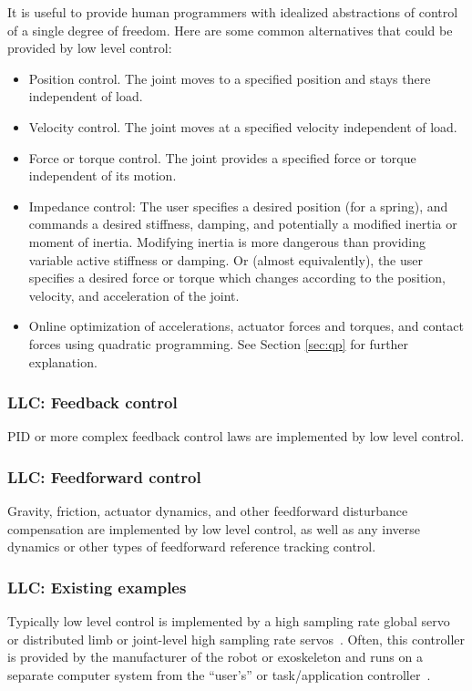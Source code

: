 \documentclass[letterpaper,12pt,fullpage]{article}
\begin{document}
It is useful to provide human programmers
with idealized abstractions of control of a single degree of
freedom. Here are some common alternatives that could be provided by low level control:
\begin{itemize}
\item
Position control. The joint moves to a specified position and stays there independent
of load.
\item
Velocity control. The joint moves at a specified velocity independent of load.
\item
Force or torque control. The joint provides a specified force or torque independent
of its motion.
\item
Impedance control: The user specifies a desired position (for a spring), and commands
a desired
stiffness, damping, and potentially a modified inertia or moment of inertia.
Modifying inertia is more dangerous than providing variable active stiffness
or damping.
Or (almost equivalently),
the user specifies a desired force or torque
which changes according to the position, velocity,
and acceleration of the joint.
\item
Online optimization of accelerations, actuator forces and torques, and contact forces
using quadratic programming. See Section \ref{sec:qp} for further explanation.
\end{itemize} 

\subsubsection{LLC: Feedback control}

PID or more complex feedback control laws are implemented by low level control.

\subsubsection{LLC: Feedforward control}

Gravity, friction, actuator dynamics, and other feedforward disturbance
compensation are implemented by low level control, as well as any inverse dynamics
or other types of feedforward reference tracking control.

\subsubsection{LLC: Existing examples}

Typically low level control is implemented
by a high sampling rate global servo~\cite{Atlas-robot}
or distributed limb or joint-level high sampling rate servos~\cite{Sarcos-robot}.
Often, this controller is provided by the manufacturer of the robot
or exoskeleton and runs on a separate computer system from the
``user's'' or task/application controller~\cite{Sarcos,Atlas}.
\end{document}
